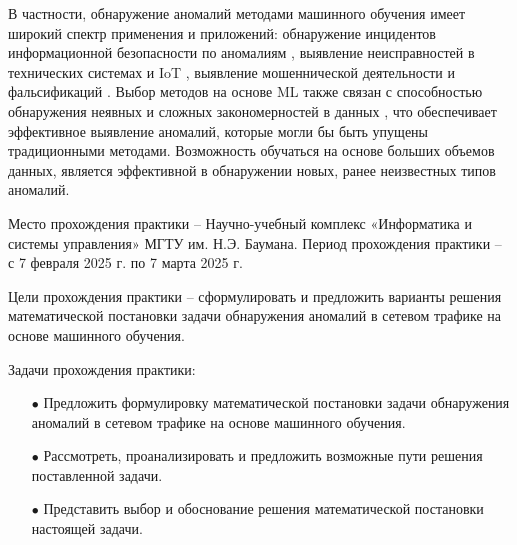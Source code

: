 В частности, обнаружение аномалий методами машинного обучения имеет широкий спектр применения и приложений: обнаружение инцидентов информационной безопасности по аномалиям \cite{Method-detection-incidents-IS}, выявление неисправностей в технических системах и IoT \cite{Diagnostics-IoT}, выявление мошеннической деятельности и фальсификаций \cite{Detection-anomalies-and-falsifications}. Выбор методов на основе ML также связан с способностью обнаружения неявных и сложных закономерностей в данных \cite{ML-powered-AD}, что обеспечивает эффективное выявление аномалий, которые могли бы быть упущены традиционными методами. Возможность обучаться на основе больших объемов данных, является эффективной в обнаружении новых, ранее неизвестных типов аномалий.

Место прохождения практики – Научно-учебный комплекс «Информатика и системы управления» МГТУ им. Н.Э. Баумана. Период прохождения практики – с 7 февраля 2025 г. по 7 марта 2025 г.

Цели прохождения практики – сформулировать и предложить варианты решения математической постановки задачи обнаружения аномалий в сетевом трафике на основе машинного обучения.

Задачи прохождения практики:

\begin{itemize}[leftmargin=0pt,itemindent=4.6em]
    \item[$\bullet$] Предложить формулировку математической постановки задачи обнаружения аномалий в сетевом трафике на основе машинного обучения.

    \item[$\bullet$] Рассмотреть, проанализировать и предложить возможные пути решения поставленной задачи.

    \item[$\bullet$] Представить выбор и обоснование решения математической постановки настоящей задачи.
\end{itemize}